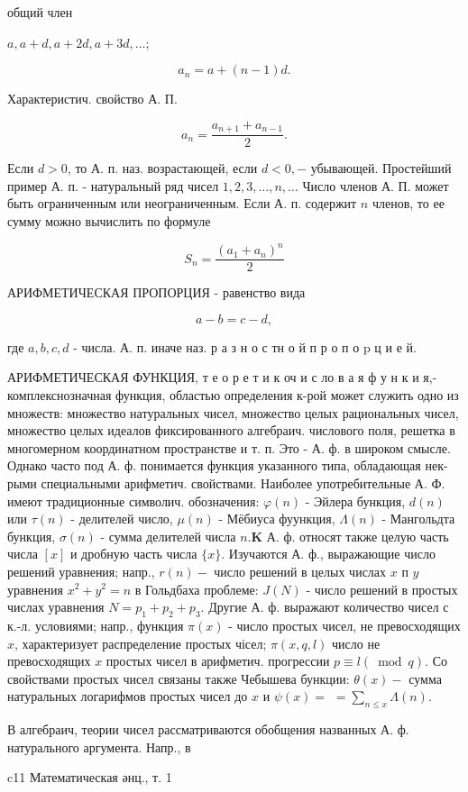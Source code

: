 \documentclass[10pt]{article}
\begin{document}
общий член



$a, a+d, a+2 d, a+3 d, \ldots$;



\[

a_{n}=a+(n-1) d .

\]



Характеристич. свойство А. П.



\[

a_{n}=\frac{a_{n+1}+a_{n-1}}{2} .

\]



Если $d>0$, то А. п. наз. возрастающей, если $d<0,-$ убывающей. Простейший пример А. п. - натуральный ряд чисел $1,2,3, \ldots, n, \ldots$ Число членов А. П. может быть ограниченным или неограниченным. Если А. п. содержит $n$ членов, то ее сумму можно вычислить по формуле



\[

S_{n}=\frac{\left(a_{1}+a_{n}\right)^{n}}{2}

\]



АРИФМЕТИЧЕСКАЯ ПРОПОРЦИЯ - равенство вида



\[

a-b=c-d,

\]



где $a, b, c, d$ - числа. А. п. иначе наз. р а з н о с тн о й п р о п о $\mathrm{p}$ ц и е й.



АРИФМЕТИЧЕСКАЯ ФУНКЦИЯ, т е о р е т и к оч и с ло в а я ф у н к и я,- комплекснозначная функция, областью определения к-рой может служить одно из множеств: множество натуральных чисел, множество целых рациональных чисел, множество целых идеалов фиксированного алгебраич. числового поля, решетка в многомерном координатном пространстве и т. п. Это - А. ф. в широком смысле. Однако часто под А. ф. понимается функция указанного типа, обладающая нек-рыми специальными арифметич. свойствами. Наиболее употребительные А. Ф. имеют традиционные символич. обозначения: $\varphi(n)$ - Эйлера бункция, $d(n)$ или $\tau(n)$ - делителей число, $\mu(n)$ - Мёбиуса фуункция, $\Lambda(n)$ - Мангольдта бункция, $\sigma(n)$ - сумма делителей числа $n . \boldsymbol{K}$ А. ф. относят также целую часть числа $[x]$ и дробную часть числа $\{x\}$. Изучаются А. ф., выражающие число решений уравнения; напр., $r(n)-$ число решений в целых числах $x$ п $y$ уравнения $x^{2}+y^{2}=n$ в Гольдбаха проблеме: $J(N)$ - число решений в простых числах уравнения $N=p_{1}+p_{2}+p_{3}$. Другие А. ф. выражают количество чисел с к.-л. условиями; напр., функция $\pi(x)$ - число простых чисел, не превосходящих $x$, характеризует распределение простых чісел; $\pi(x, q, l)$ число не превосходящих $x$ простых чисел в арифметич. прогрессии $p \equiv l(\bmod q)$. Со свойствами простых чисел связаны также Чебышева бункции: $\theta(x)-$ сумма натуральных логарифмов простых чисел до $x$ и $\psi(x)=$ $=\sum_{n \leqslant x} \Lambda(n)$.



В алгебраич, теории чисел рассматриваются обобщения названных А. ф. натурального аргумента. Напр., в



c11 Математическая әнц., т. 1
\end{document}
